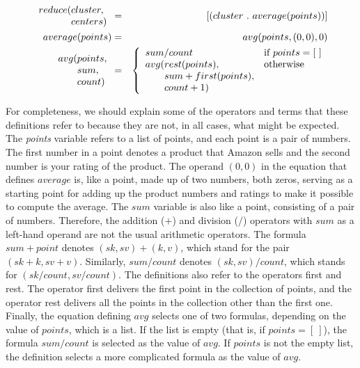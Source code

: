 
\begin{eqnarray*}
    \begin{array}{l@{}l}
        reduce(&cluster, \\
               &centers)
    \end{array} &=& [ ( cluster ~.~ average(points) ) ] \\
average(points) &=& avg(points, (0,0), 0) \\
\begin{array}{l@{}l}
    avg(&points, \\
        &sum, \\
        &count)
\end{array} &=&
    \left\{
        \begin{array}{l@{}ll}
            \multicolumn{2}{l}{sum / count} & \mbox{if } points = [~] \\
            avg(& rest(points),             & \mbox{otherwise} \\
                & sum+first(points),        & \\
                & count+1)                  & \\
        \end{array}
    \right.
\end{eqnarray*}

For completeness, we should explain some of the operators and terms
that these definitions refer to because they are not, in all cases,
what might be expected.
The \emph{points} variable refers to a list of points,
and each point is a pair of numbers. The first number in a point
denotes a product that Amazon sells and the second number is your rating
of the product.
The operand $(0,0)$ in the equation that defines $average$ is, like a point, 
made up of two numbers, both zeros, serving as a starting point for adding
up the product numbers and ratings to make it possible to compute the average.
The $sum$ variable is also like a point, consisting of a pair of numbers.
Therefore, the addition ($+$) and division ($/$) operators
with $sum$ as a left-hand operand are not the usual arithmetic operators.
The formula $sum + point$ denotes $(sk, sv) + (k,v)$, which stand for
the pair $(sk+k, sv+v)$. Similarly, $sum/count$ denotes $(sk,sv)/count$,
which stands for $(sk/count, sv/count)$. 
The definitions also refer to the operators first and rest.
The operator first delivers the first point in the collection of points,
and the operator rest delivers all the points in the collection
other than the first one. 
Finally, the equation defining $avg$ selects one of two formulas,
depending on the value of $points$, which is a list.
If the list is empty (that is, if $points = [~]$), 
the formula $sum/count$ is selected as the value of $avg$.
If $points$ is not the empty list, the definition selects
a more complicated formula as the value of $avg$.

